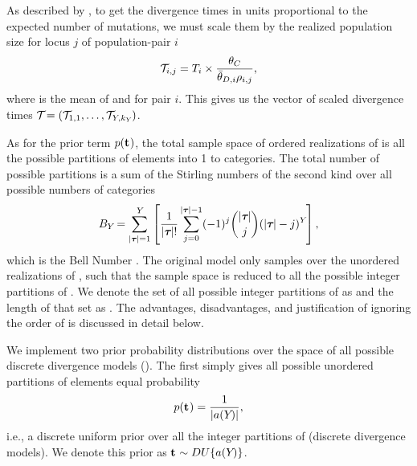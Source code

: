 \documentclass[letterpaper,12pt]{article}
\begin{document}
\begin{linenumbers}
\begin{linenomath}
As described by \citet{Oaks2012}, to get the divergence times in units
proportional to the expected number of mutations, we must
scale them by the realized population size for locus $j$ of population-pair $i$ 
\begin{equation}
    \divTimeScaled{i}{j} = \divTimeMap{i} \times \frac{\myTheta{C}}{
        \descendantThetaMean{i} \ploidyScalar{i}{j}},
    \label{eq:divTimeScaled}
\end{equation}
where  is the mean of  and
 for pair $i$.
This gives us the vector of scaled divergence times
$\divTimeScaledVector = (\divTimeScaled{1}{1}, \ldots,
\divTimeScaled{\npairs{}}{\nloci{\npairs{}}})$.
\end{linenomath}


\begin{linenomath}
As for the prior term $p(\mathbf{t_{}})$, the total sample space of
ordered realizations of \divTimeIndexVector is all the possible partitions of
\npairs{} elements into 1 to \npairs{} categories.
The total number of possible partitions is a sum of the Stirling numbers of
the second kind over all possible numbers of categories \divTimeNum
\begin{equation}
    B_{Y_{}}=\sum_{\lvert \boldsymbol{\tau_{}} \rvert=1}^{Y_{}} \left[
    \frac{1}{\lvert \boldsymbol{\tau_{}} \rvert!} \sum_{j=0}^{\lvert \boldsymbol{\tau_{}} \rvert-1} (-1)^{j}
    \binom{\lvert \boldsymbol{\tau_{}} \rvert}{j} (\lvert \boldsymbol{\tau_{}} \rvert-j)^{Y_{}} \right],
    \label{eq:bell}
\end{equation}
which is the Bell Number \citep{Bell1934}.
The original \msb model only samples over the unordered realizations of
\divTimeIndexVector, such that the sample space is reduced to all the possible
integer partitions of \npairs{} \citep{Oaks2012,Huang2011,OeisPartitionNumber,
    OeisPartitionTriangle,Malenfant2011}.
We denote the set of all possible integer partitions of \npairs{} as
\integerPartitionSet{\npairs{}} and the length of that set as
\integerPartitionNum{\npairs{}}.
The advantages, disadvantages, and justification of ignoring the order
of \divTimeIndexVector is discussed in detail below.
\end{linenomath}

\begin{linenomath}
We implement two prior probability distributions over the space
of all possible discrete divergence models (\divTimeIndexVector).
The first simply gives all possible unordered partitions of \npairs{} elements
equal probability
\begin{equation}
    p(\mathbf{t_{}}) = \frac{1}{\lvert a({Y_{}}) \rvert},
    \label{eq:divModelPriorUniform}
\end{equation}
i.e., a discrete uniform prior over all the integer partitions of \npairs{}
(discrete divergence models).
We denote this prior as
$\mathbf{t_{}} \sim DU\{a({Y_{}})\}$.
\end{linenomath}


\end{linenumbers}
\end{document}
